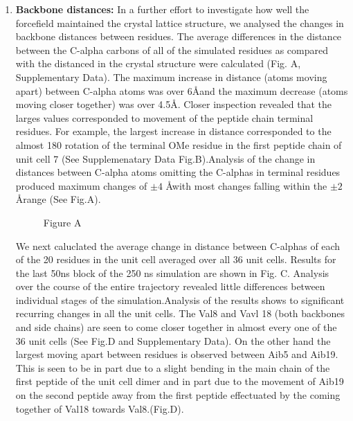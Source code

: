 \documentclass[12pt,letterpaper]{report}
\begin{document}
\begin{enumerate}
\item \textbf{Backbone distances:} In a further effort to investigate how well the forcefield maintained the crystal lattice structure, we analysed the changes in backbone distances between residues. The average differences in the distance between the C-alpha carbons of all of the simulated residues as compared with the distanced in the crystal structure were calculated (Fig. A, Supplementary Data). The maximum increase in distance (atoms moving apart) between C-alpha atoms was over 6\AA and the maximum decrease (atoms moving closer together) was over 4.5\AA. Closer inspection revealed that the larges values corresponded to movement of the peptide chain terminal residues. For example, the largest increase in distance corresponded to the almost 180 rotation of the terminal OMe residue in the first peptide chain of unit cell 7 (See Supplemenatary Data Fig.B).Analysis of the change in distances between C-alpha atoms omitting the C-alphas in terminal residues produced maximum changes of $\pm 4$ \AA with most changes falling within the $\pm2$\AA range (See Fig.A).

	\begin{figure}[H]
	\centering
	\setcounter{subfigure}{0}
	\caption{Figure A}
	\end{figure}
	
We next caluclated the average change in distance between C-alphas of each of the 20 residues in the unit cell averaged over all 36 unit cells. Results for the last 50ns block of the 250 ns simulation are shown in Fig. C. Analysis over the course of the entire trajectory revealed little differences between individual stages of the simulation.Analysis of the results shows to significant recurring changes in all the unit cells. The Val8 and Vavl 18 (both backbones and side chains) are seen to come closer together in almost every one of the 36 unit cells (See Fig.D and Supplementary Data). On the other hand the largest moving apart between residues is observed between Aib5 and Aib19. This is seen to be in part due to a slight bending in the main chain of the first peptide of the unit cell dimer and in part due to the movement of Aib19 on the second peptide away from the first peptide effectuated by the coming together of Val18 towards Val8.(Fig.D).


\end{enumerate}
\end{document}
